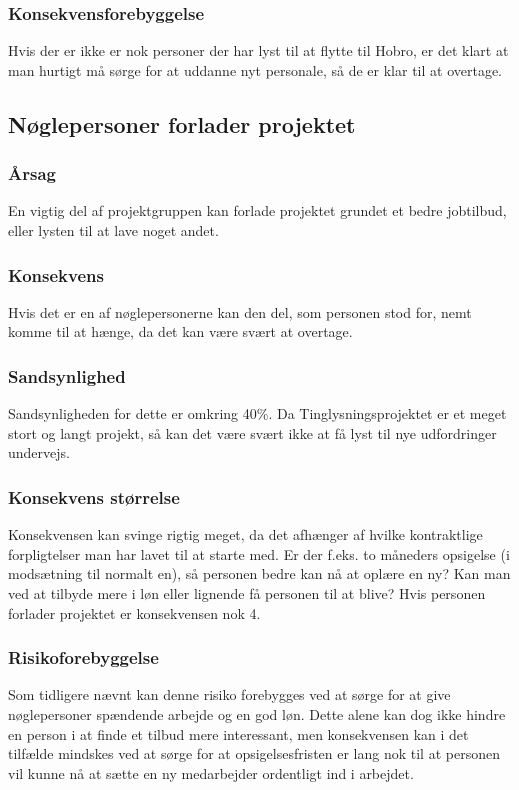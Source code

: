 \documentclass[10pt,a4paper,danish]{article}
\begin{document}
\subsubsection{Konsekvensforebyggelse}
Hvis der er ikke er nok personer der har lyst til at flytte til Hobro, er det klart at man hurtigt må sørge for at uddanne nyt personale, så de er klar til at overtage.

\subsection{Nøglepersoner forlader projektet}
\subsubsection{Årsag}
En vigtig del af projektgruppen kan forlade projektet grundet et bedre jobtilbud, eller lysten til at lave noget andet.

\subsubsection{Konsekvens}
Hvis det er en af nøglepersonerne kan den del, som personen stod for, nemt komme til at hænge, da det kan være svært at overtage. 

\subsubsection{Sandsynlighed}
Sandsynligheden for dette er omkring 40\%. Da Tinglysningsprojektet er et meget stort og langt projekt, så kan det være svært ikke at få lyst til nye udfordringer undervejs.

\subsubsection{Konsekvens størrelse}
Konsekvensen kan svinge rigtig meget, da det afhænger af hvilke kontraktlige forpligtelser man har lavet til at starte med. Er der f.eks. to måneders opsigelse (i modsætning til normalt en), så personen bedre kan nå at oplære en ny? Kan man ved at tilbyde mere i løn eller lignende få personen til at blive? Hvis personen forlader projektet er konsekvensen nok 4.

\subsubsection{Risikoforebyggelse}
Som tidligere nævnt kan denne risiko forebygges ved at sørge for at give nøglepersoner spændende arbejde og en god løn. Dette alene kan dog ikke hindre en person i at finde et tilbud mere interessant, men konsekvensen kan i det tilfælde mindskes ved at sørge for at opsigelsesfristen er lang nok til at personen vil kunne nå at sætte en ny medarbejder ordentligt ind i arbejdet.
\end{document}

